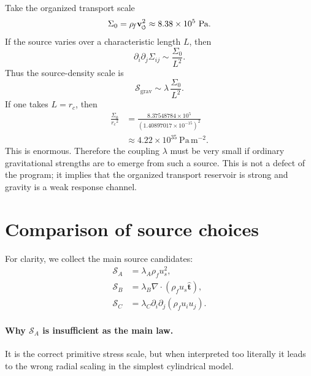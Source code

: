 \documentclass[11pt]{article}
\newcommand{\swirlarrow}{\mathchoice{\mkern-2mu\scriptstyle\boldsymbol{\circlearrowleft}}{\mkern-2mu\scriptstyle\boldsymbol{\circlearrowleft}}{\mkern-2mu\scriptscriptstyle\boldsymbol{\circlearrowleft}}{\mkern-2mu\scriptscriptstyle\boldsymbol{\circlearrowleft}}}
\newcommand{\vswirl}{\mathbf{v}_{\swirlarrow}}
\newcommand{\rhoF}{\rho_{\!f}}
\newcommand{\rc}{{r_c}}
\newcommand{\grav}{\mathrm{grav}}
\begin{document}
        Take the organized transport scale
        \[
            \Sigma_0 = \rhoF \vswirl^2 \approx 8.38\times 10^5\ \mathrm{Pa}.
        \]
        If the source varies over a characteristic length \(L\), then
        \begin{equation}
            \partial_i\partial_j \Sigma_{ij}
            \sim
            \frac{\Sigma_0}{L^2}.
            \label{eq:source-scaling}
        \end{equation}
        Thus the source-density scale is
        \begin{equation}
            \mathcal{S}_{\grav}
            \sim
            \lambda\, \frac{\Sigma_0}{L^2}.
            \label{eq:Sgrav-scale}
        \end{equation}
        If one takes \(L=\rc\), then
        \begin{align}
            \frac{\Sigma_0}{\rc^2}
            &=
            \frac{8.37548784\times 10^5}{(1.40897017\times 10^{-15})^2}
            \\
            &\approx
            4.22\times 10^{35}\ \mathrm{Pa\,m^{-2}}.
            \label{eq:source-scale-numeric}
        \end{align}
        This is enormous. Therefore the coupling \(\lambda\) must be very small if ordinary gravitational strengths are to emerge from such a source. This is not a defect of the program; it implies that the organized transport reservoir is strong and gravity is a weak response channel.
        
        \section{Comparison of source choices}
        
        For clarity, we collect the main source candidates:
        \begin{align}
            \mathcal{S}_A &= \lambda_A \rhoF u_s^2,
            \label{eq:compare-A}
            \\
            \mathcal{S}_B &= \lambda_B \nabla\cdot(\rhoF u_s \hat{\mathbf t}),
            \label{eq:compare-B}
            \\
            \mathcal{S}_C &= \lambda_C \partial_i\partial_j(\rhoF u_i u_j).
            \label{eq:compare-C}
        \end{align}
        
        \paragraph{Why \(\mathcal{S}_A\) is insufficient as the main law.}
            It is the correct primitive stress scale, but when interpreted too literally it leads to the wrong radial scaling in the simplest cylindrical model.
        
\end{document}

